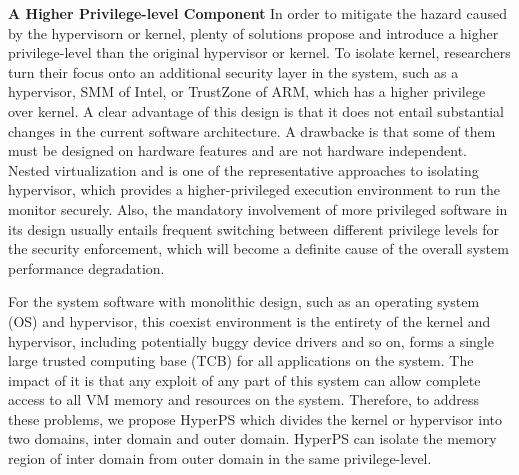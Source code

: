 \documentclass[conference]{IEEEtran}
\begin{document}
\textbf{A Higher Privilege-level Component }
In order to mitigate the hazard caused by the hypervisorn or kernel, plenty of solutions propose and introduce a higher privilege-level than the original hypervisor or kernel.
 To isolate kernel, researchers turn their focus onto an additional security layer in the system, such as a hypervisor\cite{Wang2015SecPod}, SMM of Intel\cite{Wang2010HyperCheck}, or TrustZone of ARM\cite{Sprobes}, which has a higher privilege over kernel. A clear advantage of this design is that it does not entail substantial changes in the current software architecture. A drawbacke is that some of them must be designed on hardware features and are not hardware independent.
Nested virtualization  \cite{Ben2007The} and \cite{Zhang2011CloudVisor} is one of the representative approaches to isolating hypervisor, which provides a higher-privileged execution environment to run the monitor securely. 
Also, the mandatory involvement of more privileged software in its design usually entails frequent switching between different privilege levels for
the security enforcement, which will become a definite cause of the overall system performance degradation.


For the system software with monolithic design, such as an operating system (OS) and hypervisor, this coexist environment is the entirety of the kernel and hypervisor, including potentially buggy device drivers and so on, forms a single large trusted computing base (TCB) for all applications on the system.
The impact of it is that any exploit of any part of this system can allow complete access to all VM memory and resources on the system.
Therefore, to address these problems, we propose HyperPS which divides the kernel or hypervisor into two domains, inter domain and outer domain. HyperPS can isolate the memory region of inter domain from outer domain in the same privilege-level.
\end{document}

